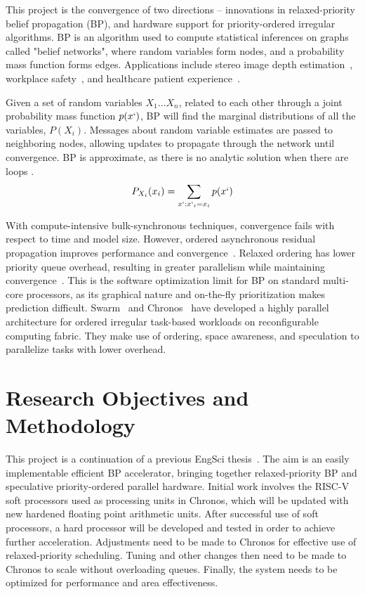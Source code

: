 This project is the convergence of two directions -- innovations in relaxed-priority belief propagation (BP), and hardware support for priority-ordered irregular algorithms. BP is an algorithm used to compute statistical inferences on graphs called "belief networks", where random variables form nodes, and a probability mass function forms edges. Applications include stereo image depth estimation~\cite{Yan_Yang_Yang_Zhao_2023}, workplace safety~\cite{Chen_McCabe_Hyatt_2017}, and healthcare patient experience~\cite{Al_Nuairi_Simsekler_Qazi_Sleptchenko_2023}. 

Given a set of random variables ${X_1 \ldots X_n}$, related to each other through a joint probability mass function $p(x`)$, BP will find the marginal distributions of all the variables, $P(X_i)$. Messages about random variable estimates are passed to neighboring nodes, allowing updates to propagate through the network until convergence. BP is approximate, as there is no analytic solution when there are loops \cite{Bishop_2006}.
\[ P_{X_i}(x_i) = \sum_{x`:x`_i=x_i} p(x`) \]

With compute-intensive bulk-synchronous techniques, convergence fails with respect to time and model size. However, ordered asynchronous residual propagation improves performance and convergence~\cite{Elidan_McGraw_Koller_2012}. Relaxed ordering has lower priority queue overhead, resulting in greater parallelism while maintaining convergence~\cite{Aksenov_Alistarh_Korhonen_2021}. This is the software optimization limit for BP on standard multi-core processors, as its graphical nature and on-the-fly prioritization makes prediction difficult. Swarm~\cite{Jeffrey_2019} and Chronos~\cite{Abeydeera_Sanchez_2020} have developed a highly parallel architecture for ordered irregular task-based workloads on reconfigurable computing fabric. They make use of ordering, space awareness, and speculation to parallelize tasks with lower overhead. 

\section*{Research Objectives and Methodology}

This project is a continuation of a previous EngSci thesis~\cite{Han_2023}. The aim is an easily implementable efficient BP accelerator, bringing together relaxed-priority BP and speculative priority-ordered parallel hardware. Initial work involves the RISC-V soft processors used as processing units in Chronos, which will be updated with new hardened floating point arithmetic units. After successful use of soft processors, a hard processor will be developed and tested in order to achieve further acceleration. Adjustments need to be made to Chronos for effective use of relaxed-priority scheduling. Tuning and other changes then need to be made to Chronos to scale without overloading queues. Finally, the system needs to be optimized for performance and area effectiveness. 

